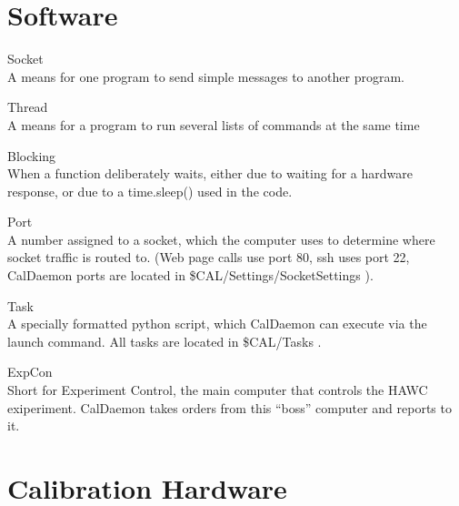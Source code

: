 \cleartooddpage[\thispagestyle{empty}]
\renewcommand{\thechapter}{\thechapter}
\renewcommand{\thesection}{\thechapter.\arabic{section}}
\renewcommand{\thesubsection}{\thechapter.\arabic{section}.\arabic{subsection}}
\renewcommand{\thesubsubsection}{\thechapter.\arabic{section}.\arabic{subsection}.\arabic{subsubsection}}
\renewcommand{\thefigure}{\thechapter.\arabic{figure}}
\renewcommand{\thetable}{\thechapter.\arabic{table}}
\renewcommand{\theequation}{\thechapter.\arabic{equation}}
\appendix


\chapter{Software}

\begin{description*}
  \item[Socket]   \hfill \\
	A means for one program to send simple messages to another program.
  \item[Thread]   \hfill \\
	A means for a program to run several lists of commands at the same time
  \item[Blocking] \hfill \\
	When a function deliberately waits, either due to waiting for a hardware response, or due to a time.sleep() used in the code.
  \item [Port]    \hfill \\
	A number assigned to a socket, which the computer uses to determine where socket traffic is routed to.
	(Web page calls use port 80, ssh uses port 22, CalDaemon ports are located in \$CAL/Settings/SocketSettings ).
\end{description*}

\begin{description*}
  \item[Task]     \hfill \\
	A specially formatted python script, which CalDaemon can execute via the launch command.  All tasks are located in \$CAL/Tasks .
  \item[ExpCon] \hfill \\
	Short for Experiment Control, the main computer that controls the HAWC exiperiment.
	CalDaemon takes orders from this ``boss'' computer and reports to it.
\end{description*}

\chapter{Calibration Hardware}\label{C1}

